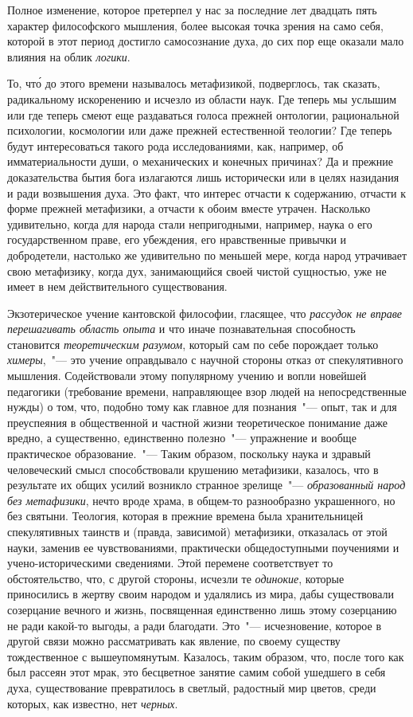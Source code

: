 Полное изменение, которое претерпел у нас за последние
лет двадцать пять характер философского мышления,
более высокая точка зрения на само себя, которой
в этот период достигло самосознание духа, до сих пор
еще оказали мало влияния на облик \emph{логики}.

То, чт\'о до этого времени называлось метафизикой,
подверглось, так сказать, радикальному искоренению и
исчезло из области наук. Где теперь мы услышим или
где теперь смеют еще раздаваться голоса прежней онтологии,
рациональной психологии, космологии или даже
прежней естественной теологии? Где теперь будут интересоваться
такого рода исследованиями, как, например,
об имматериальности души, о механических и конечных
причинах? Да и прежние доказательства бытия бога излагаются
лишь исторически или в целях назидания и ради
возвышения духа. Это факт, что интерес отчасти к содержанию,
отчасти к форме прежней метафизики, а отчасти
к обоим вместе утрачен. Насколько удивительно, когда
для народа стали непригодными, например, наука о
его государственном праве, его убеждения, его нравственные
привычки и добродетели, настолько же удивительно
по меньшей мере, когда народ утрачивает свою метафизику,
когда дух, занимающийся своей чистой сущностью,
уже не имеет в нем действительного существования.

Экзотерическое учение кантовской философии, гласящее,
что \emph{рассудок не вправе перешагивать область
опыта} и что иначе познавательная способность становится
\emph{теоретическим разумом}, который сам по себе порождает
только \emph{химеры},~"--- это учение оправдывало с научной
стороны отказ от спекулятивного мышления. Содействовали
этому популярному учению и вопли новейшей
педагогики (требование времени, направляющее взор
людей на непосредственные нужды) о том, что, подобно
тому как главное для познания~"--- опыт, так и для преуспеяния
в общественной и частной жизни теоретическое
понимание даже вредно, а существенно, единственно
полезно~"--- упражнение и вообще практическое образование.~"---
Таким образом, поскольку наука и здравый человеческий
смысл способствовали крушению метафизики,
казалось, что в результате их общих усилий возникло
странное зрелище~"--- \emph{образованный народ без метафизики},
нечто вроде храма, в общем-то разнообразно украшенного,
но без святыни. Теология, которая в прежние времена
была хранительницей спекулятивных таинств и
(правда, зависимой) метафизики, отказалась от этой науки,
заменив ее чувствованиями, практически общедоступными
поучениями и учено-историческими сведениями.
Этой перемене соответствует то обстоятельство, что, с
другой стороны, исчезли те \emph{одинокие}, которые приносились
в жертву своим народом и удалялись из мира, дабы
существовали созерцание вечного и жизнь, посвященная
единственно лишь этому созерцанию не ради какой-то
выгоды, а ради благодати. Это~"--- исчезновение, которое
в другой связи можно рассматривать как явление, по
своему существу тождественное с вышеупомянутым. Казалось,
таким образом, что, после того как был рассеян
этот мрак, это бесцветное занятие самим собой ушедшего
в себя духа, существование превратилось в светлый, радостный
мир цветов, среди которых, как известно, нет
\emph{черных}.

